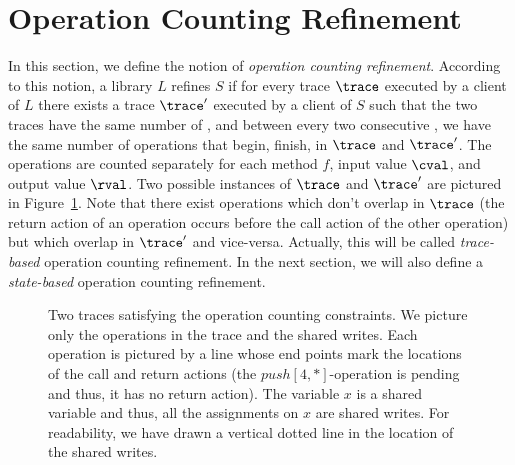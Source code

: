 
\section{Operation Counting Refinement}
\label{sec:ct_ref}
\label{sec:counting}

In this section, we define the notion of \emph{operation counting refinement}. 
According to this notion, a library $L$ refines  $S$ if for every trace $\trace$ executed by a client of $L$ there exists a trace $\trace'$ executed by a client of $S$ such that 
the two traces have the same number of {\shwrites}, and between every two consecutive {\shwrites}, we have the same number of operations that begin, \resp finish, in $\trace$ and $\trace'$. 
The operations are counted separately for each method $f$, input value $\cval$, and output value $\rval$.
Two possible instances of $\trace$ and $\trace'$ are pictured in Figure~\ref{fig:counting}.
Note that there exist operations which don't overlap in $\trace$ (\ie the return action of an operation occurs before the call action of the other operation) but which overlap in $\trace'$ and vice-versa.
Actually, this will be called \emph{trace-based} operation counting refinement. In the next section, we will also define a \emph{state-based} operation counting refinement.


\begin{figure}

\caption{Two traces satisfying the operation counting constraints. We picture only the operations in the trace and the shared writes. Each operation is pictured by a line whose end points mark the locations of the call and return actions (the $push[4,*]$-operation is pending and thus, it has no return action). The variable $x$ is a shared variable and thus, all the assignments on $x$ are shared writes. For readability, we have drawn a vertical dotted line in the location of the shared writes.}
\label{fig:counting}
\end{figure}




